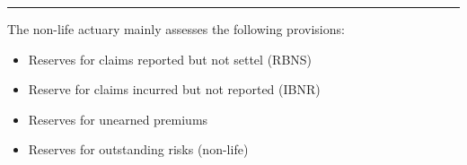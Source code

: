 \hrule

\begin{f}[Provision]
	
The non-life actuary mainly assesses
the following provisions:
\begin{itemize}
	\item Reserves for claims reported but not settel (RBNS)
	\item Reserve for claims incurred but not reported (IBNR)
	\item Reserves for unearned premiums
	\item Reserves for outstanding risks (non-life)
	
\end{itemize}

\end{f}




